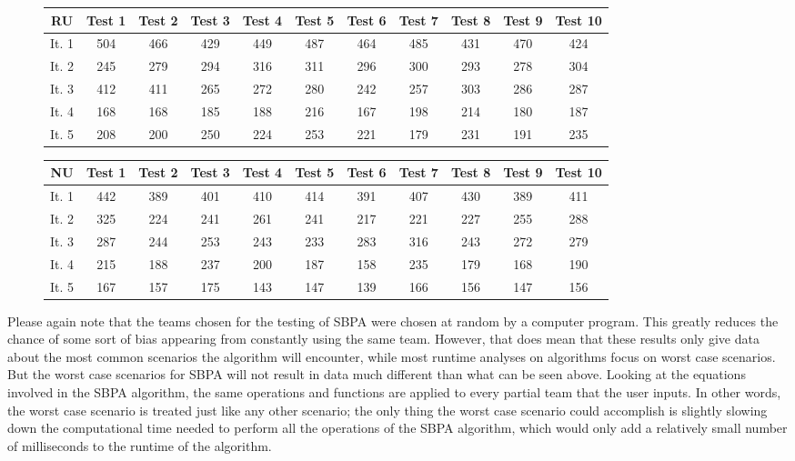 \documentclass{article}
\begin{document}
\begin{figure}[H]
	\begin{tabular}{c||c|c|c|c|c|c|c|c|c|c}
		RU&Test 1&Test 2&Test 3&Test 4&Test 5&Test 6&Test 7&Test 8&Test 9&Test 10\\
		\hline\hline
		It. 1&504&466&429&449&487&464&485&431&470&424\\
		It. 2&245&279&294&316&311&296&300&293&278&304\\
		It. 3&412&411&265&272&280&242&257&303&286&287\\
		It. 4&168&168&185&188&216&167&198&214&180&187\\
		It. 5&208&200&250&224&253&221&179&231&191&235\\
	\end{tabular}
	\centering
\end{figure}
\begin{figure}[H]
	\begin{tabular}{c||c|c|c|c|c|c|c|c|c|c}
		NU&Test 1&Test 2&Test 3&Test 4&Test 5&Test 6&Test 7&Test 8&Test 9&Test 10\\
		\hline\hline
		It. 1&442&389&401&410&414&391&407&430&389&411\\
		It. 2&325&224&241&261&241&217&221&227&255&288\\
		It. 3&287&244&253&243&233&283&316&243&272&279\\
		It. 4&215&188&237&200&187&158&235&179&168&190\\
		It. 5&167&157&175&143&147&139&166&156&147&156\\
	\end{tabular}
	\centering
\end{figure}
Please again note that the teams chosen for the testing of SBPA were chosen at random by a computer program. This greatly reduces the chance of some sort of bias appearing from constantly using the same team. However, that does mean that these results only give data about the most common scenarios the algorithm will encounter, while most runtime analyses on algorithms focus on worst case scenarios. But the worst case scenarios for SBPA will not result in data much different than what can be seen above. Looking at the equations involved in the SBPA algorithm, the same operations and functions are applied to every partial team that the user inputs. In other words, the worst case scenario is treated just like any other scenario; the only thing the worst case scenario could accomplish is slightly slowing down the computational time needed to perform all the operations of the SBPA algorithm, which would only add a relatively small number of milliseconds to the runtime of the algorithm.\\\\
\end{document}
